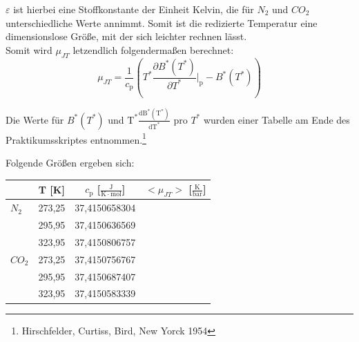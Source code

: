 \documentclass[12pt,a4paper,titlepage,headinclude,bibtotoc]{scrartcl}
\begin{document}
$\varepsilon$ ist hierbei eine Stoffkonstante der Einheit Kelvin, die für $N_\mathrm{2}$ und $CO_\mathrm{2}$ unterschiedliche Werte annimmt. Somit ist die redizierte Temperatur eine dimensionslose Größe, mit der sich leichter rechnen lässt.\\ 
Somit wird $\mu_{JT}$ letzendlich folgendermaßen berechnet:\\

\begin{equation}
\mu_{JT} = \frac{1}{c_\mathrm{p}}\left( T^* \frac{\partial B^*(T^*)}{\partial T^*} \bigg \vert_\mathrm{p} - B^*(T^*)\right)
\end{equation}

Die Werte für $B^*(T^*)$ und $\mathrm{T^*}\frac{\mathrm{dB^*(T^*)}}{\mathrm{dT^*}}$ pro $T^*$ wurden einer Tabelle am Ende des Praktikumsskriptes entnommen.\protect\footnote{Hirschfelder, Curtiss, Bird, New Yorck 1954}

Folgende Größen ergeben sich:\\

\begin{table} [h]
\begin{tabular} {l | c|  c | c}
	 &  T [K] &  $c_\mathrm{p}$ [$\frac{\mathrm{J}}{\mathrm{K}\cdot \mathrm{mol}}$] & $ <\mu_{JT}>$ [$\frac{\mathrm{K}}{\mathrm{bar}}$] \\
	 \hline
	  $N_\mathrm{2}$ & 273,25 & 37,4150658304 &  \\
	   & 295,95 & 37,4150636569 & \\
	  & 323,95 & 37,4150806757 & \\
	\hline
	$CO_\mathrm{2}$ & 273,25& 37,4150756767  &  \\
	& 295,95 & 37,4150687407 & \\
	& 323,95& 37,4150583339& \\
\end{tabular}
\end{table}





\end{document}
